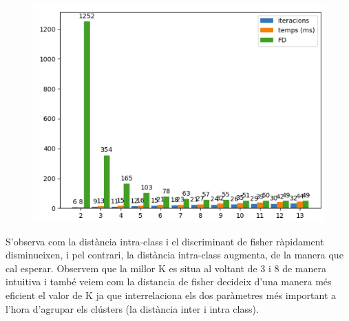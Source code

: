 \documentclass[a4paper, 11pt]{article}
\begin{document}
\begin{figure}[h!]
\begin{minipage}{.33\textwidth}
  \includegraphics[width=.8\linewidth]{kstatisticsFD.PNG}
\end{minipage}
\end{figure}
\justify
S'observa com la distància intra-class i el discriminant de fisher ràpidament disminueixen, i pel contrari, la distància intra-class augmenta, de la manera que cal esperar. Observem que la millor K es situa al voltant de 3 i 8 de manera intuitiva i també veiem com la distancia de fisher decideix d'una manera més eficient el valor de K ja que interrelaciona els dos paràmetres més important a l'hora d'agrupar els clústers (la distància inter i intra class).
\newpage
\end{document}
